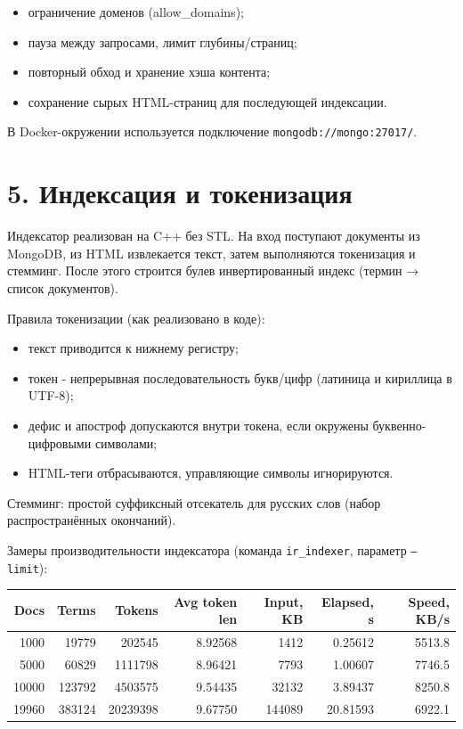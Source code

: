 ﻿\documentclass[12pt,a4paper]{article}
\begin{document}
\begin{itemize}[label=•, leftmargin=1.2em]
\item ограничение доменов (allow\_domains);
\item пауза между запросами, лимит глубины/страниц;
\item повторный обход и хранение хэша контента;
\item сохранение сырых HTML-страниц для последующей индексации.
\end{itemize}

В Docker-окружении используется подключение \texttt{mongodb://mongo:27017/}.

\section*{5. Индексация и токенизация}

Индексатор реализован на C++ без STL. На вход поступают документы из MongoDB, из HTML извлекается текст, затем выполняются токенизация и стемминг. После этого строится булев инвертированный индекс (термин → список документов).

Правила токенизации (как реализовано в коде):

\begin{itemize}[label=•, leftmargin=1.2em]
\item текст приводится к нижнему регистру;
\item токен - непрерывная последовательность букв/цифр (латиница и кириллица в UTF-8);
\item дефис и апостроф допускаются внутри токена, если окружены буквенно-цифровыми символами;
\item HTML-теги отбрасываются, управляющие символы игнорируются.
\end{itemize}

Стемминг: простой суффиксный отсекатель для русских слов (набор распространённых окончаний).

Замеры производительности индексатора (команда \texttt{ir\_indexer}, параметр \texttt{--limit}):

\begin{center}
\renewcommand{\arraystretch}{1.15}
\begin{tabular}{r r r r r r r}
\toprule
Docs & Terms & Tokens & Avg token len & Input, KB & Elapsed, s & Speed, KB/s\\
\midrule
1000 & 19779 & 202545 & 8.92568 & 1412 & 0.25612 & 5513.8\\
5000 & 60829 & 1111798 & 8.96421 & 7793 & 1.00607 & 7746.5\\
10000 & 123792 & 4503575 & 9.54435 & 32132 & 3.89437 & 8250.8\\
19960 & 383124 & 20239398 & 9.67750 & 144089 & 20.81593 & 6922.1\\
\bottomrule
\end{tabular}
\end{center}
\end{document}
